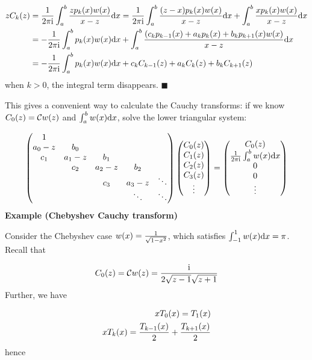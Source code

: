\documentclass[12pt,a4paper]{article}
\def\D{ {\rm d} }
\def\I{ {\rm i} }
\def\C{ {\mathbb C} }
\def\dx{\D x}
\begin{document}
\begin{align*}
z C_k(z) &= {1 \over 2 \pi \I} \int_a^b {z p_k(x) w(x) \over x -z} \dx  = {1 \over 2 \pi \I} \int_a^b {(z -x) p_k(x) w(x) \over x -z} \dx  +  \int_a^b {x p_k(x) w(x) \over x -z} \dx \\
  &= -{1 \over 2 \pi \I} \int_a^b p_k(x) w(x)  \dx +  \int_a^b {(c_k p_{k-1}(x) + a_k p_k(x) + b_k p_{k+1}(x) w(x) \over x -z} \dx \\
  &= -{1 \over 2 \pi \I} \int_a^b p_k(x) w(x)  \dx + c_k C_{k-1}(z) + a_k C_k(z) + b_k C_{k+1}(z)
\end{align*}
when $k > 0$, the integral term disappears.   \ensuremath{\blacksquare}

This gives a convenient way to calculate the Cauchy transforms: if we know $C_0(z) ={\cal C}w(z)$ and $\int_a^b w(x) \dx$, solve the lower triangular system:

\[
\begin{pmatrix}
1 \\
a_0-z & b_0 \\
c_1 & a_1-z & b_1 \\
&c_2 & a_2-z & b_2 \\
&& c_3 & a_3-z &\ddots\\
&&&\ddots & \ddots
\end{pmatrix}\begin{pmatrix}C_0(z) \\C_1(z) \\C_2(z) \\C_3(z) \\ \vdots \end{pmatrix} = \begin{pmatrix}C_0(z) \\{1 \over 2 \pi \I} \int_a^b w(x) \dx \\0 \\0 \\ \vdots \end{pmatrix} 
\]
\textbf{Example (Chebyshev Cauchy transform)} 

Consider the Chebyshev case $w(x) = {1 \over \sqrt{1-x^2}}$, which satisfies $\int_{-1}^1 w(x) \dx = {\pi}$. Recall that

\[
    C_0(z) ={\cal C}w(z) = { \I \over 2\sqrt{z-1}\sqrt{z+1}}
\]
Further, we have


\begin{align*}
x T_0(x) = T_1(x) \\
x T_k(x) = {T_{k-1}(x) \over 2} + { T_{k+1}(x) \over 2} 
\end{align*}
hence
\end{document}
